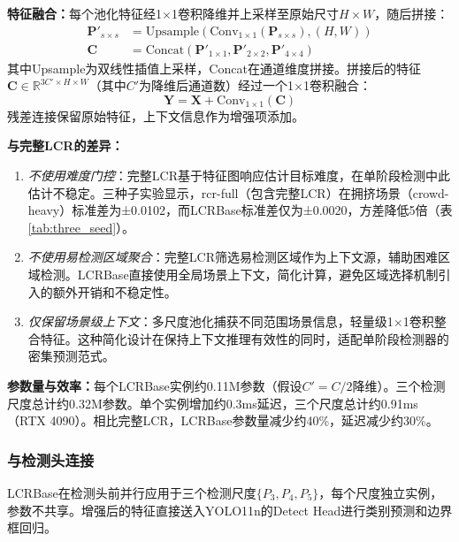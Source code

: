 \documentclass[journal]{IEEEtran}
\begin{document}
\textbf{特征融合：}每个池化特征经1$\times$1卷积降维并上采样至原始尺寸$H \times W$，随后拼接：
\begin{equation}
\begin{split}
\mathbf{P}'_{s \times s} &= \text{Upsample}(\text{Conv}_{1 \times 1}(\mathbf{P}_{s \times s}), (H, W)) \\
\mathbf{C} &= \text{Concat}(\mathbf{P}'_{1 \times 1}, \mathbf{P}'_{2 \times 2}, \mathbf{P}'_{4 \times 4})
\end{split}
\end{equation}
其中Upsample为双线性插值上采样，Concat在通道维度拼接。拼接后的特征$\mathbf{C} \in \mathbb{R}^{3C' \times H \times W}$（其中$C'$为降维后通道数）经过一个1$\times$1卷积融合：
\begin{equation}
\mathbf{Y} = \mathbf{X} + \text{Conv}_{1 \times 1}(\mathbf{C})
\end{equation}
残差连接保留原始特征，上下文信息作为增强项添加。

\textbf{与完整LCR的差异：}
\begin{enumerate}
    \item \textit{不使用难度门控}：完整LCR基于特征图响应估计目标难度，在单阶段检测中此估计不稳定。三种子实验显示，rcr-full（包含完整LCR）在拥挤场景（crowd-heavy）标准差为±0.0102，而LCRBase标准差仅为±0.0020，方差降低5倍（表\ref{tab:three_seed}）。

    \item \textit{不使用易检测区域聚合}：完整LCR筛选易检测区域作为上下文源，辅助困难区域检测。LCRBase直接使用全局场景上下文，简化计算，避免区域选择机制引入的额外开销和不稳定性。

    \item \textit{仅保留场景级上下文}：多尺度池化捕获不同范围场景信息，轻量级1$\times$1卷积整合特征。这种简化设计在保持上下文推理有效性的同时，适配单阶段检测器的密集预测范式。
\end{enumerate}

\textbf{参数量与效率：}每个LCRBase实例约0.11M参数（假设$C'=C/2$降维）。三个检测尺度总计约0.32M参数。单个实例增加约0.3ms延迟，三个尺度总计约0.91ms（RTX 4090）。相比完整LCR，LCRBase参数量减少约40\%，延迟减少约30\%。

\subsubsection{与检测头连接}

LCRBase在检测头前并行应用于三个检测尺度$\{P_3, P_4, P_5\}$，每个尺度独立实例，参数不共享。增强后的特征直接送入YOLO11n的Detect Head进行类别预测和边界框回归。
\end{document}
